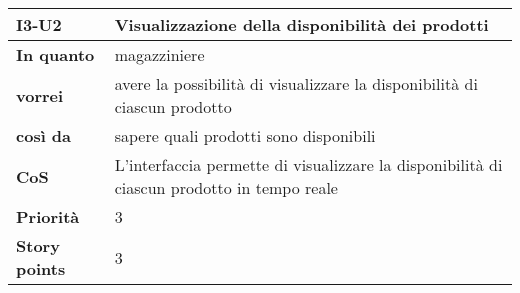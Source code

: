 \begin{table}[H]
  \begin{tabularx}{\textwidth}{lX}
    \toprule
    \textbf{I3-U2} & \textbf{Visualizzazione della disponibilità dei prodotti} \\
    \midrule
    \textbf{In quanto} & magazziniere \\
    \textbf{vorrei} & avere la possibilità di visualizzare la disponibilità di ciascun prodotto \\
    \textbf{così da} & sapere quali prodotti sono disponibili \\
    \midrule
    \textbf{CoS} & L'interfaccia permette di visualizzare la disponibilità di ciascun prodotto in tempo reale \\
    \midrule
    \textbf{Priorità} & 3 \\
    \textbf{Story points} & 3 \\
    \bottomrule
  \end{tabularx}
  \label{user-story:i3-u2}
\end{table}
